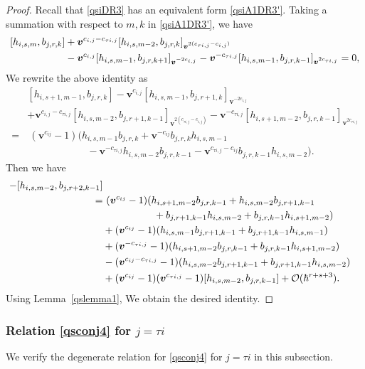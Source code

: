 \documentclass[11pt,reqno]{amsart}
\numberwithin{equation}{section}
\theoremstyle{definition}
\theoremstyle{remark}
\newcommand{\mc}{\mathcal}
\newcommand{\bv}{{\bm{v}}}
\def \h{\hbar}
\def \H{h}
\def \X{b}
\begin{document}
\begin{proof}
Recall that \eqref{qsiDR3} has an equivalent form \eqref{qsiA1DR3'}. Taking a summation with respect to $m,k$ in \eqref{qsiA1DR3'}, we have
\begin{align*}
			[\H_{i,s,m},\X_{j,r,k}]&+\bv^{c_{i,j}-c_{\tau i,j}}[ \H_{i,s,m-2},\X_{j,r,k}]_{\bv^{2(c_{\tau i,j}-c_{i,j})}}
			\\\notag
			&-\bv^{c_{i,j}}[\H_{i,s,m-1},\X_{j,r,k+1}]_{\bv^{-2c_{ i,j}}}- \bv^{-c_{\tau i, j}}[\H_{i,s,m-1},\X_{j,r,k-1}]_{\bv^{2c_{\tau i,j}}}
			=0,
		\end{align*}
We rewrite the above identity as
\begin{align*}
&[\H_{i,s+1,m-1},\X_{j,r,k}]-\bv^{c_{i,j}}[\H_{i,s,m-1},\X_{j,r+1,k}]_{\bv^{-2c_{ i,j}}}
\\
&+\bv^{c_{i,j}-c_{\tau i,j}}[ \H_{i,s,m-2},\X_{j,r+1,k-1}]_{\bv^{2(c_{\tau i,j}-c_{i,j})}}- \bv^{-c_{\tau i, j}}[\H_{i,s+1,m-2},\X_{j,r,k-1}]_{\bv^{2c_{\tau i,j}}}
\\
=&\ (\bv^{c_{ij}}-1)(\H_{i,s,m-1} \X_{j,r,k}+\bv^{-c_{ij}}\X_{j,r,k}\H_{i,s,m-1}
\\
&\qquad \qquad \qquad-\bv^{-c_{\tau i,j}}\H_{i,s,m-2} \X_{j,r,k-1}-\bv^{c_{\tau i,j}-c_{ij}}\X_{j,r,k-1}\H_{i,s,m-2}).
\end{align*}
Then we have
\begin{align*}
[\H_{i,s+2,m-2},&\,\X_{j,r,k-1}] - [\H_{i,s,m-2},\X_{j,r+2,k-1}]
\\
=&\ (\bv^{c_{ij}}-1)(\H_{i,s+1,m-2} \X_{j,r,k-1}+\H_{i,s,m-2} \X_{j,r+1,k-1} \\
&\hskip1.8cm +\X_{j,r+1,k-1} \H_{i,s,m-2}+\X_{j,r,k-1}\H_{i,s+1,m-2})
\\
&+ (\bv^{c_{ij}}-1)(\H_{i,s,m-1} \X_{j,r+1,k-1}  +\X_{j,r+1,k-1} \H_{i,s,m-1})
\\
&+(\bv^{-c_{\tau i,j}}-1)(\H_{i,s+1,m-2} \X_{j,r,k-1}+ \X_{j,r,k-1}\H_{i,s+1,m-2})
\\
&- (\bv^{c_{ij}-c_{\tau i,j}}-1)(\H_{i,s,m-2} \X_{j,r+1,k-1}  +\X_{j,r+1,k-1} \H_{i,s,m-2})
\\
&+(\bv^{c_{ij}}-1)(\bv^{c_{\tau i,j}}-1)[\H_{i,s,m-2}, \X_{j,r,k-1}]+\mc O(\h^{r+s+3}).
\end{align*}
Using Lemma~\ref{qslemma1}, We obtain the desired identity. 
\end{proof}

\subsubsection{Relation \eqref{qsconj4} for $j=\tau i$}  We verify the degenerate relation for \eqref{qsconj4} for $j=\tau i$ in this subsection. 
\end{document}
